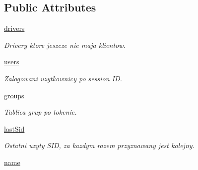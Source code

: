 \subsection*{Public Attributes}
\begin{CompactItemize}
\item 
\hyperlink{class_serv_1_1_user_group_manager_1_1_user_group_manager_00aa453d586337ce2692166c666a1817}{drivers}
\begin{CompactList}\small\item\em Drivery ktore jeszcze nie maja klientow. \item\end{CompactList}\item 
\hypertarget{class_serv_1_1_user_group_manager_1_1_user_group_manager_b41620628a204c943cd30a8f836eddd0}{
\hyperlink{class_serv_1_1_user_group_manager_1_1_user_group_manager_b41620628a204c943cd30a8f836eddd0}{users}}
\label{class_serv_1_1_user_group_manager_1_1_user_group_manager_b41620628a204c943cd30a8f836eddd0}

\begin{CompactList}\small\item\em Zalogowani uzytkownicy po session ID. \item\end{CompactList}\item 
\hypertarget{class_serv_1_1_user_group_manager_1_1_user_group_manager_4da728a66a4115432bdc2057fd3e92fa}{
\hyperlink{class_serv_1_1_user_group_manager_1_1_user_group_manager_4da728a66a4115432bdc2057fd3e92fa}{groups}}
\label{class_serv_1_1_user_group_manager_1_1_user_group_manager_4da728a66a4115432bdc2057fd3e92fa}

\begin{CompactList}\small\item\em Tablica grup po tokenie. \item\end{CompactList}\item 
\hypertarget{class_serv_1_1_user_group_manager_1_1_user_group_manager_97c7d967f8ebfe883963ff38bee5ecaf}{
\hyperlink{class_serv_1_1_user_group_manager_1_1_user_group_manager_97c7d967f8ebfe883963ff38bee5ecaf}{lastSid}}
\label{class_serv_1_1_user_group_manager_1_1_user_group_manager_97c7d967f8ebfe883963ff38bee5ecaf}

\begin{CompactList}\small\item\em Ostatni uzyty SID, za kazdym razem przyznawany jest kolejny. \item\end{CompactList}\item 
\hypertarget{class_serv_1_1_user_group_manager_1_1_user_group_manager_c2e922b108e77474d9daab6be8055436}{
\hyperlink{class_serv_1_1_user_group_manager_1_1_user_group_manager_c2e922b108e77474d9daab6be8055436}{name}}
\label{class_serv_1_1_user_group_manager_1_1_user_group_manager_c2e922b108e77474d9daab6be8055436}


\end{CompactItemize}
